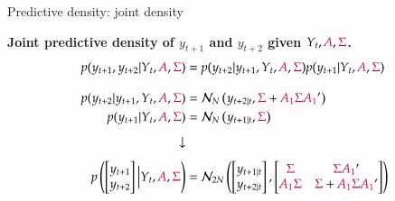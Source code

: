 \documentclass[notes,blackandwhite,mathsans,usenames,dvipsnames]{beamer}
\begin{document}
\begin{frame}{Predictive density: joint density}

\textbf{Joint predictive density of $y_{t+1}$ and $y_{t+2}$ given $Y_t, {\color{purple}A},{\color{purple}\Sigma}$.}
\begin{align*}
p(y_{t+1},y_{t+2}|Y_t, {\color{purple}A},{\color{purple}\Sigma}) &= p(y_{t+2}|y_{t+1},Y_t, {\color{purple}A},{\color{purple}\Sigma})p(y_{t+1}|Y_t, {\color{purple}A},{\color{purple}\Sigma})\\[2ex]
p(y_{t+2}|y_{t+1},Y_t, {\color{purple}A},{\color{purple}\Sigma}) &= \mathcal{N}_N\left(y_{t+2|t}, {\color{purple}\Sigma} + {\color{purple}A_1\Sigma A_1}'  \right)\\
p(y_{t+1}|Y_t, {\color{purple}A},{\color{purple}\Sigma}) &= \mathcal{N}_N\left(y_{t+1|t}, {\color{purple}\Sigma}\right)\\[1ex]
\downarrow&\\[1ex]
p\left(\begin{bmatrix}y_{t+1}\\ y_{t+2}\end{bmatrix}\Big|Y_t, {\color{purple}A},{\color{purple}\Sigma}\right) &= \mathcal{N}_{2N}\left(\begin{bmatrix} y_{t+1|t} \\ y_{t+2|t} \end{bmatrix}, \begin{bmatrix} {\color{purple}\Sigma} & {\color{purple}\Sigma A_1}' \\ {\color{purple}A_1\Sigma} & {\color{purple}\Sigma} + {\color{purple}A_1\Sigma A_1}' \end{bmatrix}\right)
\end{align*} 

\end{frame}
\end{document}
